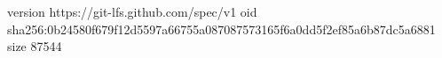version https://git-lfs.github.com/spec/v1
oid sha256:0b24580f679f12d5597a66755a087087573165f6a0dd5f2ef85a6b87dc5a6881
size 87544

